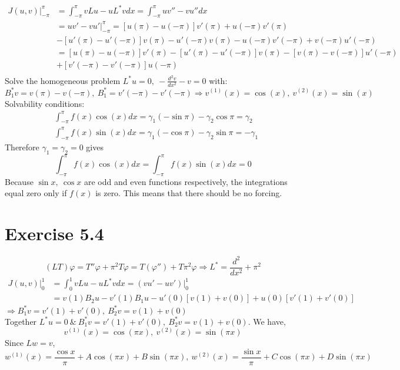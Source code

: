 \documentclass[a4paper, 11pt]{article}
\begin{document}
\begin{spacing}{1.5}
\begin{align*}
J(u,v) \Big|_{-\pi}^\pi 
& =  \int_{-\pi}^{\pi} vLu - uL^*vdx = \int_{-\pi}^{\pi} uv'' - vu''dx  \\
& = uv' - vu' \Big|_{-\pi}^\pi = \left[ u(\pi) - u(-\pi) \right] v'(\pi) + u(-\pi) v'(\pi)  \\ 
&- \left[ u'(\pi)  - u'(-\pi) \right] v(\pi) -u'(-\pi) v(\pi) - u(-\pi) v'(-\pi) + v(-\pi)u'(-\pi) \\ 
& = \left[ u(\pi) - u(-\pi) \right] v'(\pi) - \left[ u'(\pi)  - u'(-\pi) \right] v(\pi) - \left[ v(\pi) - v(-\pi) \right] u'(-\pi) \\
&+ \left[ v'(-\pi) -v'(-\pi)\right]u(-\pi) \\  
\end{align*}
Solve the homogeneous problem $L^*u=0, \ -\frac{d^2v}{dx^2} - v =0$ with: $B_1^*v = v(\pi) - v(-\pi), \ B_1^* = v'(-\pi) - v'(-\pi) \Rightarrow v^{(1)}(x)  = \cos(x), \ v^{(2)} (x) = \sin(x)$
Solvability conditions:
\begin{align*}
& \int_{-\pi}^{\pi} f(x) \cos(x)dx = \gamma_1(-\sin\pi) - \gamma_2 \cos\pi = \gamma_2 \\
& \int_{-\pi}^{\pi} f(x) \sin(x)dx = \gamma_1(-\cos\pi) - \gamma_2 \sin\pi = -\gamma_1
\end{align*}
Therefore $\gamma_1 = \gamma_2 =0 $ gives
$$
    \int_{-\pi}^{\pi} f(x) \cos(x)dx =\int_{-\pi}^{\pi} f(x) \sin(x)dx =0
$$
Because $\sin x, \ \cos x$ are odd and even functions respectively, the integrations equal zero only if $f(x)$ is zero. This means that there should be no forcing.


\section*{Exercise 5.4}
$$
    (LT)\varphi = T''\varphi + \pi^2 T \varphi = T(\varphi'') + T\pi^2\varphi \Rightarrow L^* = \frac{d^2}{dx^2} + \pi^2
$$
\begin{align*}
J(u,v) \Big|_0^1 
& = \int_{0}^{1} vLu - uL^*vdx = (vu'-uv')\Big|_0^1\\
& = v(1) B_2u - v'(1) B_1u - u'(0) \left[v(1) + v(0) \right] + u(0) \left[v'(1) + v'(0)\right]
\end{align*}
$\Rightarrow B_1^*v = v'(1) +v'(0) , \ B_2^*v=v(1) +v(0)$ \\
Together $L^*u=0 \ \& \  B_1^*v = v'(1) +v'(0) , \ B_2^*v=v(1) +v(0)$. We have, 
$$
    v^{(1)}(x) = \cos(\pi x), \ v^{(2)} (x) = \sin(\pi x)
$$
Since $Lw=v$,
$$
    w^{(1)} (x) = \frac{\cos x}{\pi} + A \cos(\pi x) + B  \sin(\pi x), \ 
    w^{(2)} (x) = \frac{\sin x}{\pi} + C \cos(\pi x) + D  \sin(\pi x)
$$


\end{spacing}
\end{document}
